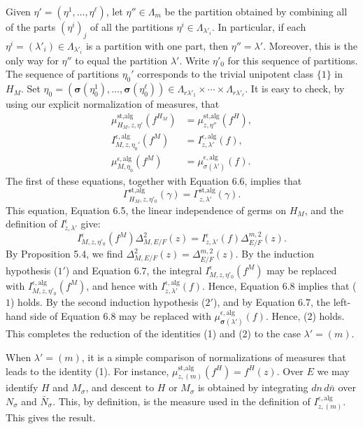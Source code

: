 \documentclass{amsart}
\begin{document}
Given $\eta' = (\eta^1,\ldots,\eta^\ell)$, let $\eta''\in\Lambda_m$ be the
partition obtained by combining all of the parts $(\eta^i)_j$ of all the
partitions $\eta^i\in\Lambda_{\lambda'_i}$.  In particular, if each
$\eta^i = (\lambda'_i)\in\Lambda_{\lambda'_i}$ is a partition with one part,
then $\eta''=\lambda'$.  Moreover, this is the only way for $\eta''$ to
equal the partition $\lambda'$.  Write $\eta'_0$ for this sequence of partitions.
The sequence of partitions $\eta_0'$ corresponds to the trivial unipotent class $\{1\}$ in $H_M$.
Set 
$\eta_0 = (\pmb\sigma(\eta^1_0),\ldots,\pmb\sigma(\eta_0^\ell))\in
  \Lambda_{r\lambda'_1}\times\cdots\times \Lambda_{r\lambda'_\ell}$.
It is easy to check, by using our explicit normalization of measures, that
\begin{align*}\label{eqn:6.7}\tag{6.7}
  \mu^{\text{st,alg}}_{H_M,z,\eta'}(f^{H_M}) &= \mu^{\text{st,alg}}_{z,\eta''}(f^H),\\
  I^{\epsilon,\text{alg}}_{M,z,\eta_0'}(f^M) &= I^{\epsilon,\text{alg}}_{z,\lambda'}(f),\\
  \mu^{\epsilon,\text{alg}}_{M,\eta_0}(f^M)
     &= \mu^{\epsilon,\text{alg}}_{\sigma(\lambda')}(f).
\end{align*}
The first of these equations, together with Equation 6.6, implies that
$$\Gamma^{\text{st,alg}}_{H_M,z,\eta'_0} (\gamma)
         = \Gamma^{\text{st,alg}}_{z,\lambda'}(\gamma).$$
This equation, Equation 6.5, the linear independence of germs on $H_M$, and the
definition of $I^\epsilon_{z,\lambda'}$ give:
\begin{equation}\label{eqn:6.8}\tag{6.8}
I^\epsilon_{M,z,\eta'_0}(f^M)\Delta^{2}_{M,E/F}(z)
      = I^\epsilon_{z,\lambda'}(f)\Delta^{m,2}_{E/F}(z).%
\end{equation}
%
By Proposition 5.4, we find $\Delta^{2}_{M,E/F}(z) = \Delta^{m,2}_{E/F}(z)$.
By the induction hypothesis ($1'$) and Equation 6.7, 
the integral $I^\epsilon_{M,z,\eta'_0}(f^M)$ may be replaced
with $I^{\epsilon,\text{alg}}_{M,z,\eta'_0}(f^M)$,
and hence with $I^{\epsilon,\text{alg}}_{z,\lambda'}(f)$.
Hence, Equation 6.8 implies that ($1$) holds.  By the second induction hypothesis ($2'$), and by 
Equation 6.7,
the left-hand side of Equation 6.8 may be replaced with
$\mu^{\epsilon,\text{alg}}_{\pmb\sigma(\lambda')}(f)$.  Hence, (2) holds.
This completes the reduction of the identities (1) and (2) to the case $\lambda'=(m)$.
\bigskip

When $\lambda'=(m)$, it is a simple comparison of normalizations of measures that leads to the
identity (1).  For instance, $\mu^{\text{st,alg}}_{z,(m)}(f^H) =
f^H(z)$. Over $E$ we may identify $H$ and $M_\sigma$, and
descent to $H$ or $M_\sigma$ is obtained by integrating $dn\,d\bar n$ over
$N_\sigma$ and $\bar N_\sigma$.  This, by definition, is the measure used
in the definition of $I^{\epsilon,\text{alg}}_{z,(m)}$.  This gives the result.
\end{document}
